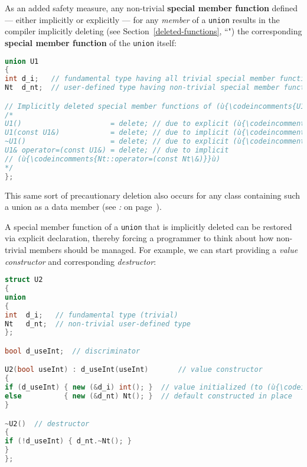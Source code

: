 \noindent As an added safety measure, any non-trivial \textbf{special member
function} defined --- either implicitly or explicitly --- for any
\emph{member} of a \texttt{union} results in the compiler implicitly
deleting (see Section~\ref{deleted-functions}, ``") the corresponding \textbf{special
member function} of the \texttt{union} itself:

\begin{lstlisting}[language=C++]
union U1
{
int d_i;   // fundamental type having all trivial special member functions
Nt  d_nt;  // user-defined type having non-trivial special member functions

// Implicitly deleted special member functions of (ù{\codeincomments{U1}}ù):
/*
U1()                     = delete; // due to explicit (ù{\codeincomments{Nt::Nt()}}ù)
U1(const U1&)            = delete; // due to implicit (ù{\codeincomments{Nt::Nt(const Nt\&)}}ù)
~U1()                    = delete; // due to explicit (ù{\codeincomments{Nt::}}ù)~(ù{\codeincomments{Nt()}}ù)
U1& operator=(const U1&) = delete; // due to implicit
// (ù{\codeincomments{Nt::operator=(const Nt\&)}}ù)
*/
};
\end{lstlisting}

\noindent This same sort of precautionary deletion also occurs for any class
containing such a union as a data member (see {\it{}: } on page~\pageref{implementing-a-sum-type-as-a-discriminating-(or-tagged)-union}).

A special member function of a \texttt{union} that is implicitly deleted
can be restored via explicit declaration, thereby forcing a programmer
to think about how non-trivial members should be managed. For example,
we can start providing a \emph{value constructor} and corresponding
\emph{destructor}:

\begin{lstlisting}[language=C++]
struct U2
{
union
{
int  d_i;   // fundamental type (trivial)
Nt   d_nt;  // non-trivial user-defined type
};

bool d_useInt;  // discriminator

U2(bool useInt) : d_useInt(useInt)       // value constructor
{
if (d_useInt) { new (&d_i) int(); }  // value initialized (to (ù{\codeincomments{0}}ù))
else          { new (&d_nt) Nt(); }  // default constructed in place
}

~U2()  // destructor
{
if (!d_useInt) { d_nt.~Nt(); }
}
};
\end{lstlisting}

